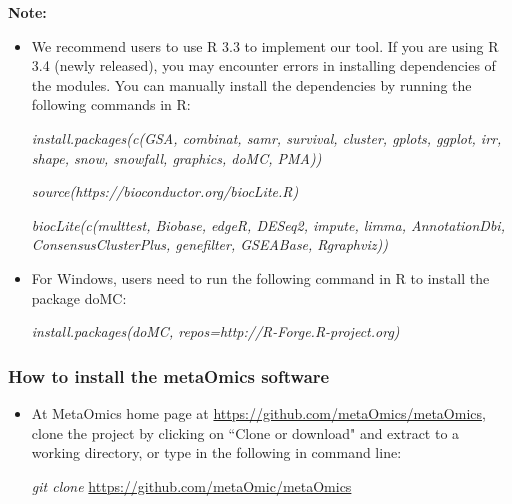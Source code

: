 {\bf Note:}
\begin{itemize}
\item We recommend users to use R 3.3 to implement our tool. If you are using R 3.4 (newly released), you may encounter errors in installing dependencies of the modules. You can manually install the dependencies by running the following commands in R:

\textit{install.packages(c(\textquotesingle GSA\textquotesingle, \textquotesingle combinat\textquotesingle, \textquotesingle   samr\textquotesingle   , \textquotesingle   survival\textquotesingle   , \textquotesingle   cluster\textquotesingle   , \textquotesingle   gplots\textquotesingle   , 
  \textquotesingle   ggplot\textquotesingle   , \textquotesingle   irr\textquotesingle   , \textquotesingle   shape\textquotesingle   , \textquotesingle   snow\textquotesingle   , \textquotesingle   snowfall\textquotesingle   , \textquotesingle   graphics\textquotesingle   , \textquotesingle   doMC\textquotesingle   , \textquotesingle   PMA\textquotesingle   ))
  }

\textit{source(\textquotesingle   https://bioconductor.org/biocLite.R\textquotesingle   )  }

\textit{biocLite(c(\textquotesingle   multtest\textquotesingle   , \textquotesingle   Biobase\textquotesingle   , \textquotesingle   edgeR\textquotesingle   , \textquotesingle   DESeq2\textquotesingle   , \textquotesingle   impute\textquotesingle   , 
  \textquotesingle   limma\textquotesingle   , \textquotesingle   AnnotationDbi\textquotesingle   , \textquotesingle   ConsensusClusterPlus\textquotesingle   , \textquotesingle   genefilter\textquotesingle   , \textquotesingle   GSEABase\textquotesingle   , \textquotesingle   Rgraphviz\textquotesingle   ))
  }

\item For Windows, users need to run the following command in R to install the package \textquotesingle doMC\textquotesingle:

\textit{install.packages(\textquotesingle doMC\textquotesingle, repos=\textquotesingle http://R-Forge.R-project.org\textquotesingle)}

\end{itemize}

 

\subsubsection{How to install the metaOmics software}
\begin{itemize}
\item At MetaOmics home page at \url{https://github.com/metaOmics/metaOmics}, clone the project by
clicking on ``Clone or download" and extract to a working directory, 
or type in the following in command line:

\textit{git clone} \url{https://github.com/metaOmic/metaOmics}
\end{itemize}

